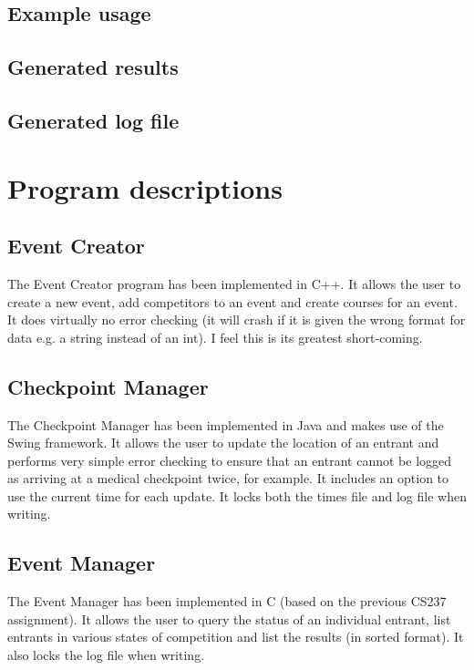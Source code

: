 \documentclass[a4paper, twoside]{article}
\begin{document}
\subsection{Example usage}
\subsection{Generated results}
\subsection{Generated log file}

\section{Program descriptions}
\subsection{Event Creator}
The Event Creator program has been implemented in C++. It allows the user to
create a new event, add competitors to an event and create courses for an event.
It does virtually no error checking (it will crash if it is given the wrong
format for data e.g. a string instead of an int). I feel this is its greatest
short-coming.
\subsection{Checkpoint Manager}
The Checkpoint Manager has been implemented in Java and makes use of the Swing
framework. It allows the user to update the location of an entrant and performs
very simple error checking to ensure that an entrant cannot be logged as
arriving at a medical checkpoint twice, for example. It includes an option to
use the current time for each update. It locks both the times file and log file
when writing.
\subsection{Event Manager}
The Event Manager has been implemented in C (based on the previous CS237
assignment). It allows the user to query the status of an individual entrant,
list entrants in various states of competition and list the results (in sorted
format). It also locks the log file when writing.
\end{document}
